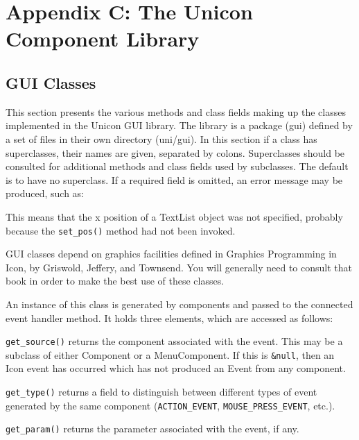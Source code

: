 \clearpage\section{Appendix C: The Unicon Component Library}

\subsection{GUI Classes}

This section presents the various methods and class fields making up the
classes implemented in the Unicon GUI library. The library is a package
(gui) defined by a set of files in their own directory (uni/gui). In
this section if a class has superclasses, their names are given,
separated by colons. Superclasses should be consulted for additional
methods and class fields used by subclasses. The
default is to have no superclass.
If a required field is omitted, an error message may be produced,
such as:


\noindent This means that the x position of a TextList object was not specified,
probably because the \texttt{set\_pos()} method had not been invoked.

GUI classes depend on graphics facilities defined in
{\textquotedbl}Graphics Programming in Icon{\textquotedbl}, by
Griswold, Jeffery, and Townsend. You will generally need to consult
that book in order to make the best use of these classes.


An instance of this class is generated by components and passed to the
connected event handler method. It holds three elements, which
are accessed as follows:

\noindent\texttt{get\_source()} returns the component associated with the event. This may
be a subclass of either Component or a MenuComponent. If this is
\texttt{\&null}, then an Icon event has occurred which has not produced an Event
from any component.

\noindent\texttt{get\_type()} returns a field to distinguish between different types of
event generated by the same component (\texttt{ACTION\_EVENT},
\texttt{MOUSE\_PRESS\_EVENT}, etc.).

\noindent\texttt{get\_param()} returns the parameter associated with the event, if any.


